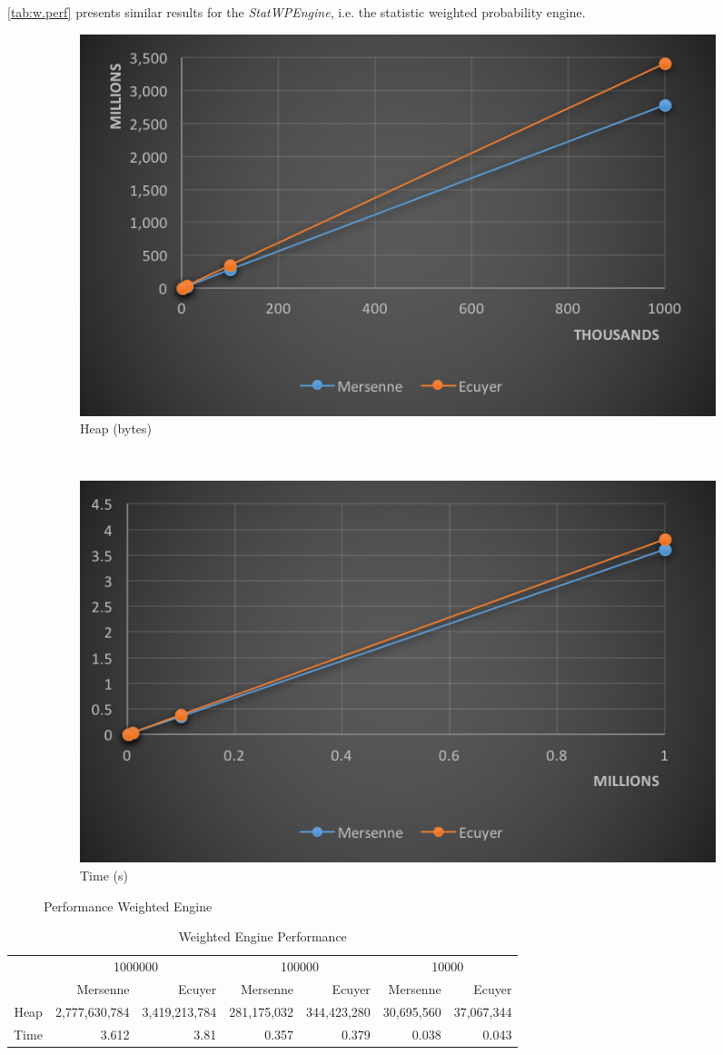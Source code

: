 \documentclass[12pt,a4paper,titlepage]{article}
\begin{document}
\autoref{tab:w.perf} presents similar results for the \emph{StatWPEngine}, 
i.e. the statistic weighted probability engine.
\begin{figure}[h!]
\centering
    \begin{subfigure}[b]{0.47\textwidth}
        \includegraphics[width=\textwidth]{img/perf-heap-w.png}
        \caption{Heap (bytes)}
    \end{subfigure}
    ~ 
    \begin{subfigure}[b]{0.47\textwidth}
        \includegraphics[width=\textwidth]{img/perf-time-w.png}
        \caption{Time (s)}
    \end{subfigure}
\caption{Performance Weighted Engine}
\label{fig:perf.w}
\end{figure}
\begin{table}[htbp!]
  \centering \tiny
    \begin{tabular}{r|rrrrrr}
    \multicolumn{1}{r}{} & \multicolumn{2}{c}{1000000} & \multicolumn{2}{c}{100000} & \multicolumn{2}{c}{10000} \\
    \multicolumn{1}{r}{} & Mersenne & Ecuyer & Mersenne & Ecuyer & Mersenne & Ecuyer \\
\cmidrule{2-7}    Heap  & 2,777,630,784 & 3,419,213,784 & 281,175,032 & 344,423,280 & 30,695,560 & 37,067,344 \\
    Time  & 3.612 & 3.81  & 0.357 & 0.379 & 0.038 & 0.043 \\
    \end{tabular}%
  \caption{Weighted Engine Performance}
  \label{tab:w.perf}%
\end{table}%
\end{document}
